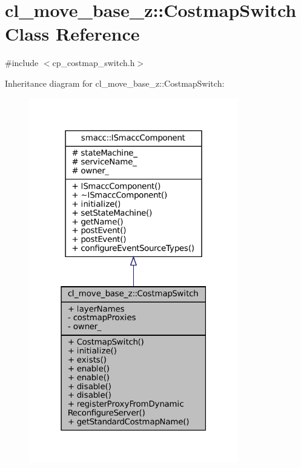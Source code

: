 \hypertarget{classcl__move__base__z_1_1CostmapSwitch}{}\section{cl\+\_\+move\+\_\+base\+\_\+z\+:\+:Costmap\+Switch Class Reference}
\label{classcl__move__base__z_1_1CostmapSwitch}


{\ttfamily \#include $<$cp\+\_\+costmap\+\_\+switch.\+h$>$}



Inheritance diagram for cl\+\_\+move\+\_\+base\+\_\+z\+:\+:Costmap\+Switch\+:
\nopagebreak
\begin{figure}[H]
\begin{center}
\leavevmode
\includegraphics[width=259pt]{classcl__move__base__z_1_1CostmapSwitch__inherit__graph}
\end{center}
\end{figure}


